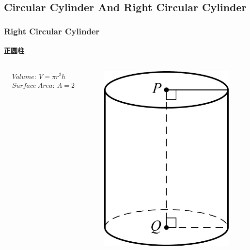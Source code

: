 \documentclass[
	11pt, %
]{beamer}
\begin{document}

\subsection{Circular Cylinder And Right Circular Cylinder}


\begin{frame}
\frametitle{ Right Circular Cylinder}
\framesubtitle{正圆柱}

\begin{columns}[t] 
		\begin{column}{0.6\textwidth} %
			\begin{equation*}
			\begin{aligned}
			&Volume: \ V = \pi r^2h\\
			&Surface\ Area:\ A = 2\pi r^2 + 2\pi r h
			\end{aligned}
			\end{equation*}		

		\end{column}
		\begin{column}{0.2\textwidth} %
			\begin{figure}
				\includegraphics[width=\linewidth]{Right_Circular_Cylinder.jpg}
			\end{figure}
		\end{column}
	\end{columns}
\end{frame}
\end{document}
